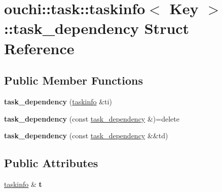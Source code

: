 \hypertarget{structouchi_1_1task_1_1taskinfo_1_1task__dependency}{}\section{ouchi\+::task\+::taskinfo$<$ Key $>$\+::task\+\_\+dependency Struct Reference}
\label{structouchi_1_1task_1_1taskinfo_1_1task__dependency}
\subsection*{Public Member Functions}
\begin{DoxyCompactItemize}
\item 
\mbox{\label{structouchi_1_1task_1_1taskinfo_1_1task__dependency_ab74a93b543e934fb2d02ab4be976079e}} 
{\bfseries task\+\_\+dependency} (\mbox{\hyperlink{classouchi_1_1task_1_1taskinfo}{taskinfo}} \&ti)
\item 
\mbox{\label{structouchi_1_1task_1_1taskinfo_1_1task__dependency_ac47795a2c620f280fc63f5f031053e5b}} 
{\bfseries task\+\_\+dependency} (const \mbox{\hyperlink{structouchi_1_1task_1_1taskinfo_1_1task__dependency}{task\+\_\+dependency}} \&)=delete
\item 
\mbox{\label{structouchi_1_1task_1_1taskinfo_1_1task__dependency_a8a8d5efced5d5e7502f86465dd7e300f}} 
{\bfseries task\+\_\+dependency} (const \mbox{\hyperlink{structouchi_1_1task_1_1taskinfo_1_1task__dependency}{task\+\_\+dependency}} \&\&td)
\end{DoxyCompactItemize}
\subsection*{Public Attributes}
\begin{DoxyCompactItemize}
\item 
\mbox{\label{structouchi_1_1task_1_1taskinfo_1_1task__dependency_a3ad3f7e74c15770b112f2f11efabaff7}} 
\mbox{\hyperlink{classouchi_1_1task_1_1taskinfo}{taskinfo}} \& {\bfseries t}
\end{DoxyCompactItemize}
